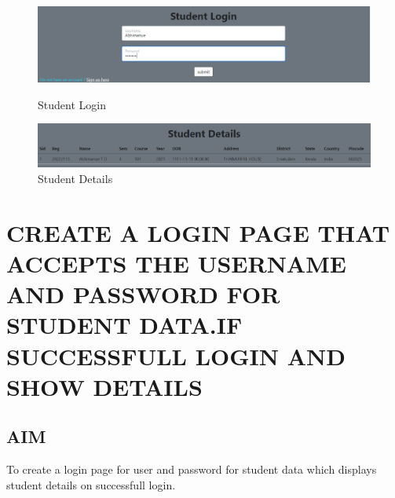 \documentclass{article}
\begin{document}
\newpage
{}
\begin{flushleft}
\begin{figure}[h]
\vspace{1in}
\includegraphics[width=16cm]{Login.png}
\caption{Student Login}
\label{fig:figure2}
\vspace{1in}
\includegraphics[width=16cm]{Details.png}
\caption{Student Details}
\label{fig:figure2}
\end{figure}
\newpage
\section{CREATE A LOGIN PAGE THAT ACCEPTS THE USERNAME AND PASSWORD FOR STUDENT DATA.IF SUCCESSFULL LOGIN AND SHOW DETAILS}
\hrulefill
\vspace{1cm}
\subsection{AIM}
To create a login page for user and password for student data which displays student details on successfull login.

\end{flushleft}
\end{document}
